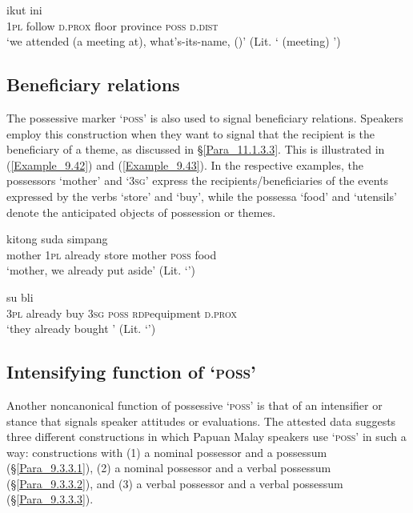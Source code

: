 \ea
\label{Example_9.41}
 {ikut} {ini} {} {} {} {}\\ %
 \textsc{1pl}  follow  \textsc{d.prox}  floor  province  \textsc{poss}  \textsc{d.dist}\\
\glt
‘we attended (a meeting at), what’s-its-name,  ()’ (Lit. ‘ (meeting) ’) \textstyleExampleSource{[081010-001-Cv.0043]}
\z


\subsection{Beneficiary relations}
\label{Para_9.3.2}
The possessive marker  ‘\textsc{poss}’ is also used to signal beneficiary relations. Speakers employ this construction when they want to signal that the recipient is the beneficiary of a  theme, as discussed in §\ref{Para_11.1.3.3}. This is illustrated in (\ref{Example_9.42}) and (\ref{Example_9.43}). In the respective examples, the possessors  ‘mother’ and  ‘\textsc{3sg}’ express the recipients/beneficiaries of the events expressed by the verbs  ‘store’ and  ‘buy’, while the possessa  ‘food’ and  ‘utensils’ denote the anticipated objects of possession or themes.


\ea
\label{Example_9.42}
 {kitong} {suda} {simpang} {} {} {}\\ %
 mother  \textsc{1pl}  already  store  mother  \textsc{poss}  food\\
\glt 
‘mother, we already put  aside’ (Lit. ‘’) \textstyleExampleSource{[080924-002-Pr.0005]}
\z

\ea
\label{Example_9.43}
 {su} {bli} {} {} {} {}\\ %
 \textsc{3pl}  already  buy  \textsc{3sg}  \textsc{poss}  \textsc{rdp}{\Tilde}equipment  \textsc{d.prox}\\
\glt
‘they already bought ’ (Lit. ‘’) \textstyleExampleSource{[080922-001a-CvPh.0558]}
\z


\subsection{Intensifying function of  ‘\textsc{poss}’}
\label{Para_9.3.3}
Another noncanonical function of possessive  ‘\textsc{poss}’ is that of an intensifier or stance that signals speaker attitudes or evaluations. The attested data suggests three different constructions in which Papuan Malay speakers use  ‘\textsc{poss}’ in such a way: constructions with (1) a nominal possessor and a  possessum (§\ref{Para_9.3.3.1}), (2) a nominal possessor and a verbal possessum (§\ref{Para_9.3.3.2}), and (3) a verbal possessor and a verbal possessum (§\ref{Para_9.3.3.3}).



